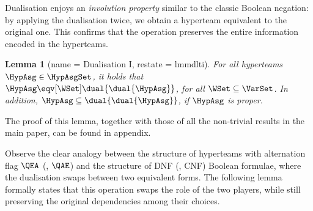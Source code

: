 \documentclass[authoryear]{elsarticle}
\newtheorem{lemma}{Lemma}
\begin{document}
Dualisation enjoys an \emph{involution property} similar to the classic Boolean
negation: by applying the dualisation twice, we obtain a hyperteam equivalent to
the original one.
This confirms that the operation preserves the entire information encoded in the
hyperteams.

\begin{lemma}[name = Dualisation I, restate = lmmdlti]
  \label{lmm:dlti}
  For all hyperteams $\HypAsg \in \HypAsgSet$, it holds that $\HypAsg
  \eqv[\WSet] \dual{\dual{\HypAsg}}$, for all $\WSet \subseteq \VarSet$.
  In addition, $\HypAsg \subseteq \dual{\dual{\HypAsg}}$, if $\HypAsg$ is
  proper.
\end{lemma}

The proof of this lemma, together with those of all the non-trivial results in
the main paper, can be found in appendix.

Observe the clear analogy between the structure of hyperteams with alternation
flag $\QEA$ (\resp, $\QAE$) and the structure of DNF (\resp, CNF) Boolean
formulae, where the dualisation swaps between two equivalent forms.
The following lemma formally states that this operation swaps the role of the
two players, while still preserving the original dependencies among their
choices.
\end{document}
